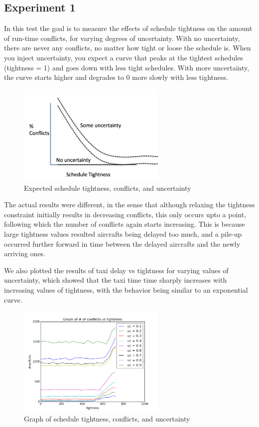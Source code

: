 \documentclass[conference]{IEEEtran}
\begin{document}
\subsection{Experiment 1}

In this test the goal is to measure the effects of schedule tightness on the amount of run-time conflicts, for varying degrees of uncertainty. With no uncertainty, there are never any conflicts, no matter how tight or loose the schedule is. When you inject uncertainty, you expect a curve that peaks at the tightest schedules (tightness = 1) and goes down with less tight schedules. With more uncertainty, the curve starts higher and degrades to 0 more slowly with less tightness.

\begin{figure}[!t]
\centering
\includegraphics[width=2.8in]{exp1-expected}
\caption{Expected schedule tightness, conflicts, and uncertainty\label{exp1-expected}}
\end{figure}

The actual results were different, in the sense that although relaxing the tightness constraint initially results in decreasing conflicts, this only occurs upto a point, following which the number of conflicts again starts increasing. This is because large tightness values resulted aircrafts being delayed too much, and a pile-up occurred further forward in time between the delayed aircrafts and the newly arriving ones. 

We also plotted the results of taxi delay vs tightness for varying values of uncertainty, which showed that the taxi time time sharply increases with increasing values of tightness, with the behavior being similar to an exponential curve.

\begin{figure}[!t]
\centering
\includegraphics[width=2.8in]{exp1-g1}
\caption{Graph of schedule tightness, conflicts, and uncertainty\label{exp1-g1}}
\end{figure}
\end{document}
